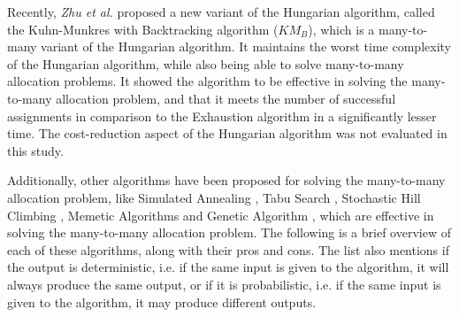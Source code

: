 Recently, \textit{Zhu et al.} \cite{zhu2016solving} proposed a new variant of the Hungarian algorithm, called the Kuhn-Munkres with Backtracking algorithm ($KM_B$), which is a many-to-many variant of the Hungarian algorithm. It maintains the worst time complexity of the Hungarian algorithm, while also being able to solve many-to-many allocation problems. It showed the algorithm to be effective in solving the many-to-many allocation problem, and that it meets the number of successful assignments in comparison to the Exhaustion algorithm in a significantly lesser time. The cost-reduction aspect of the Hungarian algorithm was not evaluated in this study.

Additionally, other algorithms have been proposed for solving the many-to-many allocation problem, like Simulated Annealing \cite{bertsimas1993simulated}, Tabu Search \cite{glover1990tabu}, Stochastic Hill Climbing \cite{juels1995stochastic}, Memetic Algorithms \cite{neri2012memetic} and Genetic Algorithm \cite{lambora2019genetic}, which are effective in solving the many-to-many allocation problem. The following is a brief overview of each of these algorithms, along with their pros and cons. The list also mentions if the output is deterministic, i.e. if the same input is given to the algorithm, it will always produce the same output, or if it is probabilistic, i.e. if the same input is given to the algorithm, it may produce different outputs.

